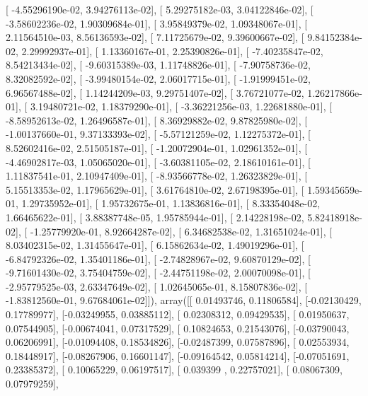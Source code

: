 \documentclass{article}
\begin{document}
       [ -4.55296190e-02,   3.94276113e-02],
       [  5.29275182e-03,   3.04122846e-02],
       [ -3.58602236e-02,   1.90309684e-01],
       [  3.95849379e-02,   1.09348067e-01],
       [  2.11564510e-03,   8.56136593e-02],
       [  7.11725679e-02,   9.39600667e-02],
       [  9.84152384e-02,   2.29992937e-01],
       [  1.13360167e-01,   2.25390826e-01],
       [ -7.40235847e-02,   8.54213434e-02],
       [ -9.60315389e-03,   1.11748826e-01],
       [ -7.90758736e-02,   8.32082592e-02],
       [ -3.99480154e-02,   2.06017715e-01],
       [ -1.91999451e-02,   6.96567488e-02],
       [  1.14244209e-03,   9.29751407e-02],
       [  3.76721077e-02,   1.26217866e-01],
       [  3.19480721e-02,   1.18379290e-01],
       [ -3.36221256e-03,   1.22681880e-01],
       [ -8.58952613e-02,   1.26496587e-01],
       [  8.36929882e-02,   9.87825980e-02],
       [ -1.00137660e-01,   9.37133393e-02],
       [ -5.57121259e-02,   1.12275372e-01],
       [  8.52602416e-02,   2.51505187e-01],
       [ -1.20072904e-01,   1.02961352e-01],
       [ -4.46902817e-03,   1.05065020e-01],
       [ -3.60381105e-02,   2.18610161e-01],
       [  1.11837541e-01,   2.10947409e-01],
       [ -8.93566778e-02,   1.26323829e-01],
       [  5.15513353e-02,   1.17965629e-01],
       [  3.61764810e-02,   2.67198395e-01],
       [  1.59345659e-01,   1.29735952e-01],
       [  1.95732675e-01,   1.13836816e-01],
       [  8.33354048e-02,   1.66465622e-01],
       [  3.88387748e-05,   1.95785944e-01],
       [  2.14228198e-02,   5.82418918e-02],
       [ -1.25779920e-01,   8.92664287e-02],
       [  6.34682538e-02,   1.31651024e-01],
       [  8.03402315e-02,   1.31455647e-01],
       [  6.15862634e-02,   1.49019296e-01],
       [ -6.84792326e-02,   1.35401186e-01],
       [ -2.74828967e-02,   9.60870129e-02],
       [ -9.71601430e-02,   3.75404759e-02],
       [ -2.44751198e-02,   2.00070098e-01],
       [ -2.95779525e-03,   2.63347649e-02],
       [  1.02645065e-01,   8.15807836e-02],
       [ -1.83812560e-01,   9.67684061e-02]]), array([[ 0.01493746,  0.11806584],
       [-0.02130429,  0.17789977],
       [-0.03249955,  0.03885112],
       [ 0.02308312,  0.09429535],
       [ 0.01950637,  0.07544905],
       [-0.00674041,  0.07317529],
       [ 0.10824653,  0.21543076],
       [-0.03790043,  0.06206991],
       [-0.01094408,  0.18534826],
       [-0.02487399,  0.07587896],
       [ 0.02553934,  0.18448917],
       [-0.08267906,  0.16601147],
       [-0.09164542,  0.05814214],
       [-0.07051691,  0.23385372],
       [ 0.10065229,  0.06197517],
       [ 0.039399  ,  0.22757021],
       [ 0.08067309,  0.07979259],
\end{document}
